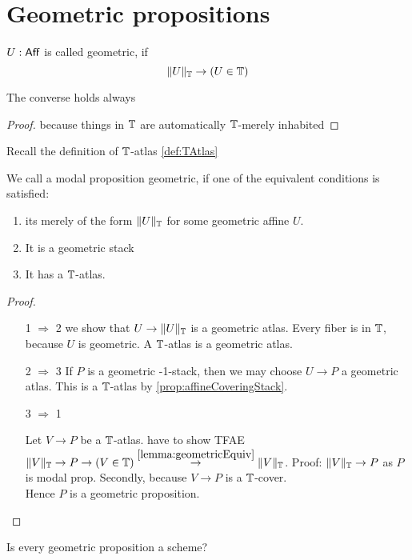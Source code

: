 
\section{Geometric propositions}
\begin{definition}
	$U : \mathsf{Aff}$ is called geometric, if 
	\[\|U\|_{\mathbb{T}} \to (U \in \mathbb{T})\]	
\end{definition}
\begin{lemma}{\label{lemma:geometricEquiv}}
	The converse holds always
\end{lemma}
\begin{proof}
	because things in $\mathbb{T}$ are automatically $\mathbb{T}$-merely inhabited
\end{proof}
Recall the definition of $\mathbb{T}$-atlas \ref{def:TAtlas}
\begin{definition}{\label{def:algprop}}
	We call a modal proposition geometric, if one of the equivalent conditions is satisfied:
	\begin{enumerate}
		\item  its merely of the form $\|U\|_{\mathbb{T}}$ for some geometric affine $U$.
		\item It is a geometric stack
		\item It has a $\mathbb{T}$-atlas.

	\end{enumerate}
	
\end{definition}
\begin{proof} \
	\begin{enumerate}
		\item [1 $\Rightarrow$ 2]
		we show that $U \to \|U\|_{\mathbb{T}}$ is a geometric atlas. Every fiber is in $\mathbb{T}$, because $U$ is geometric. A $\mathbb{T}$-atlas is a geometric atlas.
		\item [2 $\Rightarrow$ 3]
		If $P$ is a geometric -1-stack, then we may choose $U \to P$ a geometric atlas. This is a $\mathbb{T}$-atlas by \ref{prop:affineCoveringStack}.

		\item [3 $\Rightarrow$ 1]
		
		Let $V \to P$ be a $\mathbb{T}$-atlas.
		have to show TFAE $\|V\|_{\mathbb{T}} \to P \to (V \in \mathbb{T}) \overset{\ref{lemma:geometricEquiv}}{\to} \|V\|_{\mathbb{T}}$. 
		Proof: $\|V\|_{\mathbb{T}} \to P$ as $P$ is modal prop. Secondly, because $V \to P$ is a $\mathbb{T}$-cover. \\
		Hence $P$ is a geometric proposition.
	\end{enumerate}
	
\end{proof}
\begin{question}
Is every geometric proposition a scheme?
\end{question}

